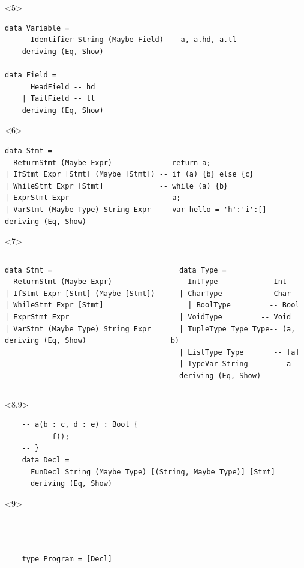 \documentclass{beamer}
\begin{document}
\begin{frame}[fragile]
\begin{onlyenv}<5>
  \begin{verbatim}
data Variable = 
      Identifier String (Maybe Field) -- a, a.hd, a.tl
    deriving (Eq, Show)

data Field =
      HeadField -- hd
    | TailField -- tl
    deriving (Eq, Show)
  \end{verbatim}
\end{onlyenv}

\begin{onlyenv}<6>
  \begin{verbatim}
data Stmt =
  ReturnStmt (Maybe Expr)           -- return a;
| IfStmt Expr [Stmt] (Maybe [Stmt]) -- if (a) {b} else {c}
| WhileStmt Expr [Stmt]             -- while (a) {b}
| ExprStmt Expr                     -- a;
| VarStmt (Maybe Type) String Expr  -- var hello = 'h':'i':[]
deriving (Eq, Show)
  \end{verbatim}
\end{onlyenv}

\begin{onlyenv}<7>

\begin{columns}
  \begin{verbatim}
data Stmt =
  ReturnStmt (Maybe Expr)           
| IfStmt Expr [Stmt] (Maybe [Stmt]) 
| WhileStmt Expr [Stmt]            
| ExprStmt Expr                   
| VarStmt (Maybe Type) String Expr
deriving (Eq, Show)
\end{verbatim}

  \begin{verbatim}
  data Type =
    IntType          -- Int
  | CharType         -- Char
    | BoolType         -- Bool
  | VoidType         -- Void
  | TupleType Type Type-- (a, b)
  | ListType Type       -- [a]
  | TypeVar String      -- a
  deriving (Eq, Show)
  \end{verbatim}
\end{columns}
\end{onlyenv}

\begin{onlyenv}<8,9>
  \begin{verbatim}
    -- a(b : c, d : e) : Bool {
    --     f();
    -- }
    data Decl = 
      FunDecl String (Maybe Type) [(String, Maybe Type)] [Stmt]
      deriving (Eq, Show)
  \end{verbatim}
\end{onlyenv}
\begin{onlyenv}<9>
  \begin{verbatim} 



    type Program = [Decl] 
  \end{verbatim}
\end{onlyenv}



\end{frame}
\end{document}
